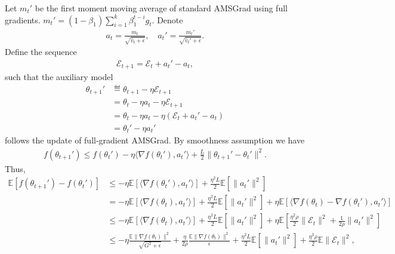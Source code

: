 \documentclass[11pt]{article}
\begin{document}
%


Let $m_t'$ be the first moment moving average of standard AMSGrad using full gradients. $m_t'=(1-\beta_1)\sum_{i=1}^k\beta_1^{t-i} g_t$. Denote
\begin{align*}
    a_t=\frac{m_t}{\sqrt{\hat v_t+\epsilon}},\quad a_t'=\frac{m_t'}{\sqrt{\hat v_t'+\epsilon}}.
\end{align*}
Define the sequence
\begin{align*}
    \mathcal E_{t+1}=\mathcal E_t+a_t'-a_t,
\end{align*}
such that the auxiliary model
\begin{align*}
    \theta_{t+1}'&\eqdef\theta_{t+1}-\eta \mathcal E_{t+1}\\
    &=\theta_t-\eta a_t-\eta\mathcal E_{t+1}\\
    &=\theta_t-\eta a_t-\eta(\mathcal E_t+a_t'-a_t)\\
    &=\theta_t'-\eta a_t'
\end{align*}
follows the update of full-gradient AMSGrad. By smoothness assumption we have
\begin{align*}
    f(\theta_{t+1}')\leq f(\theta_t')-\eta\langle \nabla f(\theta_t'), a_t'\rangle+\frac{L}{2}\| \theta_{t+1}'-\theta_t'\|^2.
\end{align*}
Thus,
\begin{align*}
    \mathbb E[f(\theta_{t+1}')-f(\theta_t')]&\leq -\eta\mathbb E[\langle \nabla f(\theta_t'), a_t'\rangle]+\frac{\eta^2L}{2}\mathbb E[\|a_t'\|^2]\\
    &=-\eta\mathbb E[\langle \nabla f(\theta_t), a_t'\rangle]+\frac{\eta^2L}{2}\mathbb E[\|a_t'\|^2]+\eta\mathbb E[\langle \nabla f(\theta_t)-\nabla f(\theta_t'),a_t'\rangle] \\
    &\leq -\eta\mathbb E[\langle \nabla f(\theta_t), a_t'\rangle]+\frac{\eta^2L}{2}\mathbb E[\|a_t'\|^2]+\eta\mathbb E[\frac{\eta^2\rho}{2}\|\mathcal E_{t}\|^2+\frac{1}{2\rho}\|a_t'\|^2]\\
    &\leq -\eta\frac{\mathbb E\|\nabla f(\theta_t)\|^2}{\sqrt{G^2+\epsilon}}+\frac{\eta}{2\rho}\frac{\mathbb E\|\nabla f(\theta_t)\|^2}{\epsilon}+\frac{\eta^2L}{2}\mathbb E[\|a_t'\|^2]+\frac{\eta^3\rho}{2}\mathbb E\|\mathcal E_{t}\|^2,
\end{align*}
\end{document}
